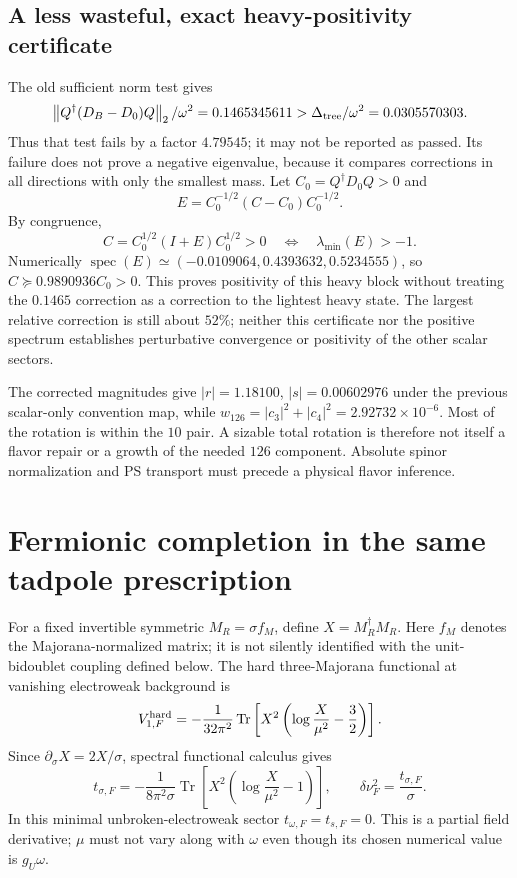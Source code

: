 \documentclass[11pt]{article}
\newcommand{\tr}{\operatorname{Tr}}
\newcommand{\norm}[1]{\left\lVert#1\right\rVert_2}
\begin{document}
\subsection{A less wasteful, exact heavy-positivity certificate}
The old sufficient norm test gives
\begin{equation}
 \norm{Q^\dagger(D_B-D_0)Q}/\omega^2=0.1465345611
 >\Delta_{\rm tree}/\omega^2=0.0305570303.
\end{equation}
Thus that test fails by a factor $4.79545$; it may not be reported as
passed. Its failure does not prove a negative eigenvalue, because it
compares corrections in all directions with only the smallest mass.
Let $C_0=Q^\dagger D_0Q>0$ and
\begin{equation}
 E=C_0^{-1/2}(C-C_0)C_0^{-1/2}.
\end{equation}
By congruence,
\begin{equation}
 C=C_0^{1/2}(I+E)C_0^{1/2}>0
 \quad\Longleftrightarrow\quad \lambda_{\min}(E)>-1.
\end{equation}
Numerically $\operatorname{spec}(E)\simeq(-0.0109064,0.4393632,0.5234555)$,
so $C\succeq0.9890936C_0>0$. This proves positivity of this heavy block
without treating the $0.1465$ correction as a correction to the lightest
heavy state. The largest relative correction is still about $52\%$;
neither this certificate nor the positive spectrum establishes
perturbative convergence or positivity of the other scalar sectors.

The corrected magnitudes give $|r|=1.18100$, $|s|=0.00602976$ under the
previous scalar-only convention map, while
$w_{126}=|c_3|^2+|c_4|^2=2.92732\times10^{-6}$.
Most of the rotation is within the $10$ pair. A sizable total rotation is
therefore not itself a flavor repair or a growth of the needed $126$
component. Absolute spinor normalization and PS transport must precede a
physical flavor inference.

\section{Fermionic completion in the same tadpole prescription}
For a fixed invertible symmetric $M_R=\sigma f_M$, define $X=M_R^\dagger M_R$.
Here $f_M$ denotes the Majorana-normalized matrix; it is not silently
identified with the unit-bidoublet coupling defined below.
The hard three-Majorana functional at vanishing electroweak background is
\begin{equation}
 V_{1,F}^{\rm hard}=-\frac1{32\pi^2}
 \tr\left[X^2\left(\log\frac{X}{\mu^2}-\frac32\right)\right].
\end{equation}
Since $\partial_\sigma X=2X/\sigma$, spectral functional calculus gives
\begin{equation}
 t_{\sigma,F}=-\frac1{8\pi^2\sigma}
 \tr\left[X^2\left(\log\frac{X}{\mu^2}-1\right)\right],\qquad
 \delta\nu_F^2=\frac{t_{\sigma,F}}{\sigma}.
\label{eq:Ftad}
\end{equation}
In this minimal unbroken-electroweak sector $t_{\omega,F}=t_{s,F}=0$.
This is a partial field derivative; $\mu$ must not vary along with
$\omega$ even though its chosen numerical value is $g_U\omega$.
\end{document}
